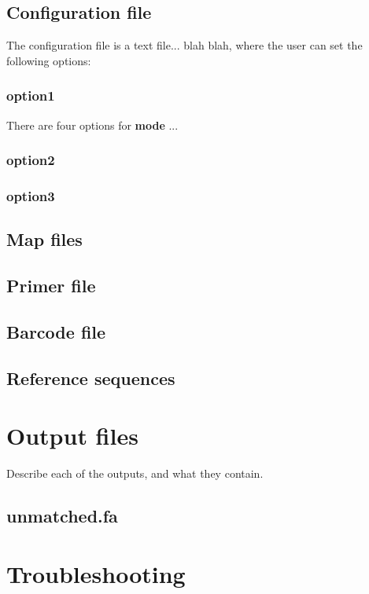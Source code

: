 \documentclass[12pt,letterpaper]{article}
\begin{document}
\subsection{Configuration file}
The configuration file is a text file... blah blah, where the user can
set the following options:

\subsubsection{option1} %
There are four options for \textbf{mode} ... 

\subsubsection{option2}

\subsubsection{option3}

\subsection{Map files}

\subsection{Primer file}

\subsection{Barcode file}

\subsection{Reference sequences}

\bigskip\section{Output files}
Describe each of the outputs, and what they contain.

\subsection{unmatched.fa}

\bigskip\section{Troubleshooting}
\end{document}
